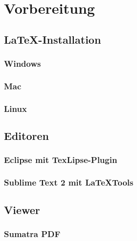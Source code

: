 \section{Vorbereitung}
\subsection{\LaTeX-Installation}
\subsubsection{Windows}
\subsubsection{Mac}
\subsubsection{Linux}

\subsection{Editoren}
\subsubsection{Eclipse mit TexLipse-Plugin}
\subsubsection{Sublime Text 2 mit LaTeXTools}

\subsection{Viewer}
\subsubsection{Sumatra PDF}

